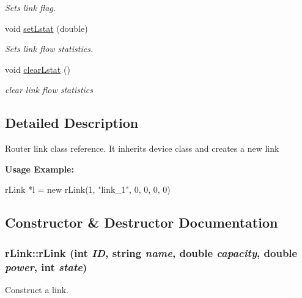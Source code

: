 \begin{DoxyCompactItemize}
\begin{DoxyCompactList}\small\item\em Sets link flag. \item\end{DoxyCompactList}\item 
void \hyperlink{classrLink_a719c8cee2887f566dd4e0ca6df81f0de}{setLstat} (double)
\begin{DoxyCompactList}\small\item\em Sets link flow statistics. \item\end{DoxyCompactList}\item 
void \hyperlink{classrLink_a60204cffa46245fb1e2c7d7a7872dbcb}{clearLstat} ()
\begin{DoxyCompactList}\small\item\em clear link flow statistics \item\end{DoxyCompactList}\end{DoxyCompactItemize}


\subsection{Detailed Description}
Router link class reference. It inherits device class and creates a new link

{\bfseries Usage Example:} 
\begin{DoxyCode}
 rLink *l = new rLink(1, "link_1", 0, 0, 0, 0)
\end{DoxyCode}
 

\subsection{Constructor \& Destructor Documentation}
\hypertarget{classrLink_acd7f5f66409693e86cd33e4a6e6964b8}{
\subsubsection[{rLink}]{\setlength{\rightskip}{0pt plus 5cm}rLink::rLink (int {\em ID}, \/  string {\em name}, \/  double {\em capacity}, \/  double {\em power}, \/  int {\em state})}}
\label{classrLink_acd7f5f66409693e86cd33e4a6e6964b8}


Construct a link. 


